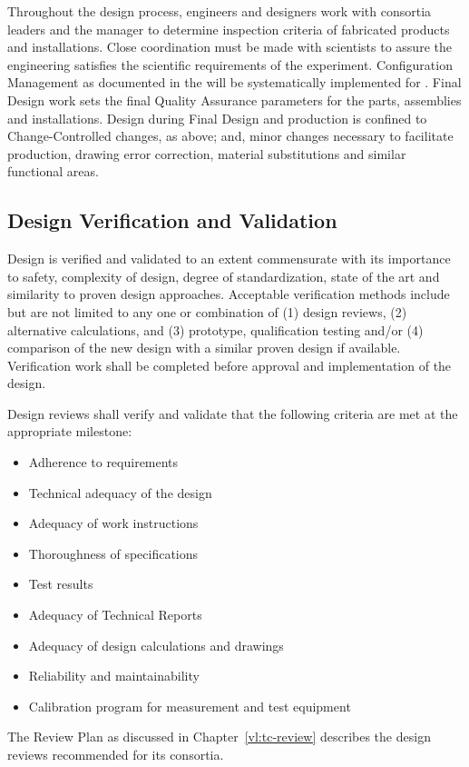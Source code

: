 Throughout the design process, engineers and designers work with
consortia leaders and the   manager to
determine  inspection criteria of fabricated products and
installations. Close coordination must be made with 
scientists to assure the engineering satisfies the scientific
requirements of the experiment. Configuration Management as documented
in the   will be
systematically implemented for . Final Design work sets
the final Quality Assurance parameters for the parts, assemblies and
installations. Design during Final Design and production is confined
to Change-Controlled changes, as above; and, minor changes necessary
to facilitate production, drawing error correction, material
substitutions and similar functional areas.

\subsection{Design Verification and Validation}
\label{sec:verification}

Design is verified and validated to an extent commensurate with its
importance to safety, complexity of design, degree of standardization,
state of the art and similarity to proven design
approaches. Acceptable verification methods include but are not
limited to any one or combination of (1) design reviews, (2)
alternative calculations, and (3) prototype, qualification testing
and/or (4) comparison of the new design with a similar proven design
if available. Verification work shall be completed before approval and
implementation of the design.

Design reviews shall verify and validate that the following criteria
are met at the appropriate milestone:
\begin{itemize}
 \item Adherence to requirements
 \item Technical adequacy of the design
 \item Adequacy of work instructions
 \item Thoroughness of specifications
 \item Test results
 \item Adequacy of Technical Reports
 \item Adequacy of design calculations and drawings
 \item Reliability and maintainability
 \item Calibration program for measurement and test equipment
\end{itemize}
The  Review Plan as discussed in
Chapter~\ref{vl:tc-review} describes the design reviews recommended
for its consortia.

